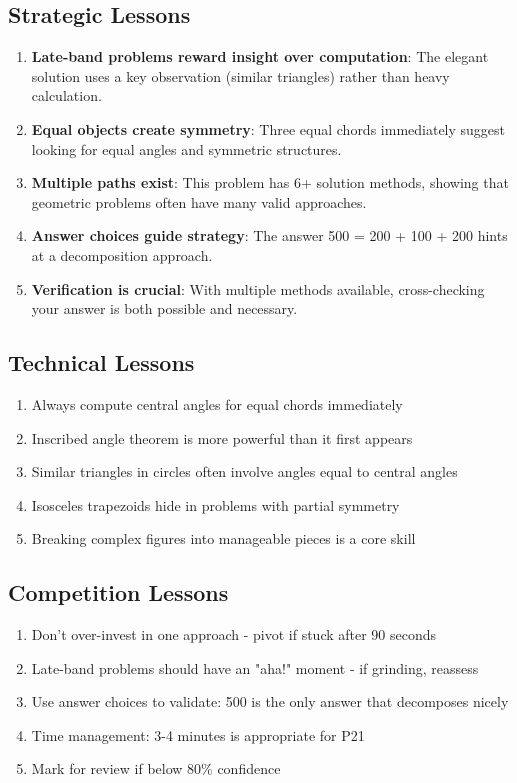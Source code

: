 \documentclass[12pt]{article}
\begin{document}
\subsection*{Strategic Lessons}
\begin{enumerate}[leftmargin=*]
    \item \textbf{Late-band problems reward insight over computation}: The elegant solution uses a key observation (similar triangles) rather than heavy calculation.
    
    \item \textbf{Equal objects create symmetry}: Three equal chords immediately suggest looking for equal angles and symmetric structures.
    
    \item \textbf{Multiple paths exist}: This problem has 6+ solution methods, showing that geometric problems often have many valid approaches.
    
    \item \textbf{Answer choices guide strategy}: The answer 500 = 200 + 100 + 200 hints at a decomposition approach.
    
    \item \textbf{Verification is crucial}: With multiple methods available, cross-checking your answer is both possible and necessary.
\end{enumerate}

\subsection*{Technical Lessons}
\begin{enumerate}[leftmargin=*]
    \item Always compute central angles for equal chords immediately
    \item Inscribed angle theorem is more powerful than it first appears
    \item Similar triangles in circles often involve angles equal to central angles
    \item Isosceles trapezoids hide in problems with partial symmetry
    \item Breaking complex figures into manageable pieces is a core skill
\end{enumerate}

\subsection*{Competition Lessons}
\begin{enumerate}[leftmargin=*]
    \item Don't over-invest in one approach - pivot if stuck after 90 seconds
    \item Late-band problems should have an "aha!" moment - if grinding, reassess
    \item Use answer choices to validate: 500 is the only answer that decomposes nicely
    \item Time management: 3-4 minutes is appropriate for P21
    \item Mark for review if below 80\% confidence
\end{enumerate}
\end{document}

